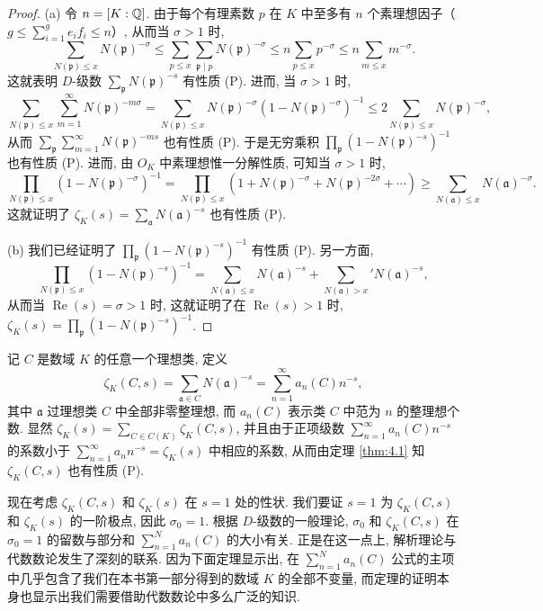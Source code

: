 \begin{proof}
(a) 令 $n=[K:\mathbb{Q}]$. 由于每个有理素数 $p$ 在 $K$ 中至多有 $n$ 个素理想因子（$g\leqslant\sum_{i=1}^{g}e_if_i\leqslant n$）, 从而当 $\sigma>1$ 时, 
\[
  \sum_{N(\mathfrak{p})\leqslant x}N(\mathfrak{p})^{-\sigma}
  \leqslant\sum_{p\leqslant x}\sum_{\mathfrak{p}\mid p}N(\mathfrak{p})^{-\sigma}
  \leqslant n\sum_{p\leqslant x}p^{-\sigma}
  \leqslant n\sum_{m\leqslant x}m^{-\sigma}.
\]
这就表明 $D$-级数 $\sum_{\mathfrak{p}}N(\mathfrak{p})^{-s}$ 有性质 (P). 进而, 当 $\sigma>1$ 时, 
\[
  \sum_{N(\mathfrak{p})\leqslant x}\sum_{m=1}^{\infty}N(\mathfrak{p})^{-m\sigma}
  =\sum_{N(\mathfrak{p})\leqslant x}N(\mathfrak{p})^{-\sigma}(1-N(\mathfrak{p})^{-\sigma})^{-1}
  \leqslant 2\sum_{N(\mathfrak{p})\leqslant x}N(\mathfrak{p})^{-\sigma},
\]
从而 $\sum_{\mathfrak{p}}\sum_{m=1}^{\infty}N(\mathfrak{p})^{-ms}$ 也有性质 (P). 于是无穷乘积 $\prod_{\mathfrak{p}}(1-N(\mathfrak{p})^{-s})^{-1}$ 也有性质 (P). 进而, 由 $O_K$ 中素理想惟一分解性质, 可知当 $\sigma>1$ 时, 
\[
  \prod_{N(\mathfrak{p})\leqslant x}(1-N(\mathfrak{p})^{-\sigma})^{-1}
  =\prod_{N(\mathfrak{p})\leqslant x}(1+N(\mathfrak{p})^{-\sigma}+N(\mathfrak{p})^{-2\sigma}+\cdots)
  \geqslant\sum_{N(\mathfrak{a})\leqslant x}N(\mathfrak{a})^{-\sigma}.
\]
这就证明了 $\zeta_K(s)=\sum_{\mathfrak{a}}N(\mathfrak{a})^{-s}$ 也有性质 (P). 

(b) 我们已经证明了 $\prod_{\mathfrak{p}}(1-N(\mathfrak{p})^{-s})^{-1}$ 有性质 (P). 另一方面, 
\[
  \prod_{N(\mathfrak{p})\leqslant x}(1-N(\mathfrak{p})^{-s})^{-1}
  =\sum_{N(\mathfrak{a})\leqslant x}N(\mathfrak{a})^{-s}+\sum_{N(\mathfrak{a})>x}'N(\mathfrak{a})^{-s},
\]
从而当 $\operatorname{Re}(s)=\sigma>1$ 时, 这就证明了在 $\operatorname{Re}(s)>1$ 时, $\zeta_K(s)=\prod_{\mathfrak{p}}(1-N(\mathfrak{p})^{-s})^{-1}$. 
\end{proof}

\begin{remark}
记 $C$ 是数域 $K$ 的任意一个理想类, 定义
\[
  \zeta_K(C,s)=\sum_{\mathfrak{a}\in C}N(\mathfrak{a})^{-s}=\sum_{n=1}^{\infty}a_n(C)n^{-s},
\]
其中 $\mathfrak{a}$ 过理想类 $C$ 中全部非零整理想, 而 $a_n(C)$ 表示类 $C$ 中范为 $n$ 的整理想个数. 显然 $\zeta_K(s)=\sum_{C\in C(K)}\zeta_K(C,s)$, 并且由于正项级数 $\sum_{n=1}^{\infty}a_n(C)n^{-s}$ 的系数小于 $\sum_{n=1}^{\infty}a_nn^{-s}=\zeta_K(s)$ 中相应的系数, 从而由定理 \ref{thm:4.1} 知 $\zeta_K(C,s)$ 也有性质 (P). 
\end{remark}

\begin{sloppypar}
现在考虑 $\zeta_K(C,s)$ 和 $\zeta_K(s)$ 在 $s=1$ 处的性状. 我们要证 $s=1$ 为 $\zeta_K(C,s)$ 和 $\zeta_K(s)$ 的一阶极点, 因此 $\sigma_0=1$. 根据 $D$-级数的一般理论, $\sigma_0$ 和 $\zeta_K(C,s)$ 在 $\sigma_0=1$ 的留数与部分和 $\sum_{n=1}^{N}a_n(C)$ 的大小有关. 正是在这一点上, 解析理论与代数数论发生了深刻的联系. 因为下面定理显示出, 在 $\sum_{n=1}^{N}a_n(C)$ 公式的主项中几乎包含了我们在本书第一部分得到的数域 $K$ 的全部不变量, 而定理的证明本身也显示出我们需要借助代数数论中多么广泛的知识. 
\end{sloppypar}

